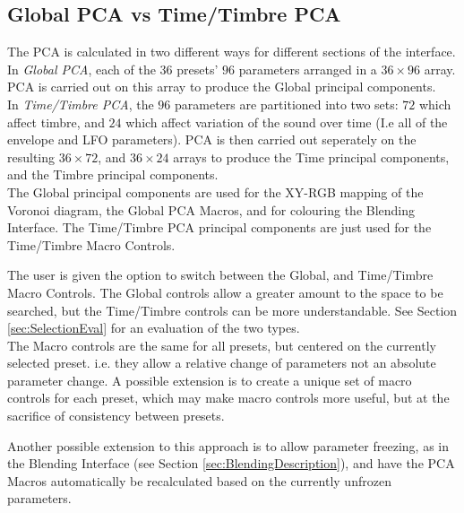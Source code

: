 \documentclass[11pt, oneside]{report}   	%
\begin{document}
\subsection{Global PCA vs Time/Timbre PCA}\label{sec:GlobalTimeTimbre}
The PCA is calculated in two different ways for different sections of the interface. In \emph{Global PCA}, each of the $36$ presets' $96$ parameters arranged in a $36 \times 96$ array. PCA is carried out on this array to produce the Global principal components. 
\\
In \emph{Time/Timbre PCA}, the $96$ parameters are partitioned into two sets: $72$ which affect timbre, and $24$ which affect variation of the sound over time (I.e all of the envelope and LFO parameters). PCA is then carried out seperately on the resulting  $36 \times 72$, and $36 \times 24$ arrays to produce the Time principal components, and the Timbre principal components. 
\\
The Global principal components are used for the XY-RGB mapping of the Voronoi diagram, the Global PCA Macros, and for colouring the Blending Interface. The Time/Timbre PCA principal components are just used for the Time/Timbre Macro Controls.

The user is given the option to switch between the Global, and Time/Timbre Macro Controls. The Global controls allow a greater amount to the space to be searched, but the Time/Timbre controls can be more understandable. See Section \ref{sec:SelectionEval} for an evaluation of the two  types.\\
The Macro controls are the same for all presets, but centered on the currently selected preset. i.e. they allow a relative change of parameters not an absolute parameter change. A possible extension is to create a unique set of macro controls for each preset, which may make macro controls more useful, but at the sacrifice of consistency between presets.

Another possible extension to this approach is to allow parameter freezing, as in the Blending Interface (see Section \ref{sec:BlendingDescription}), and have the PCA Macros automatically be recalculated based on the currently unfrozen parameters.
\end{document}

